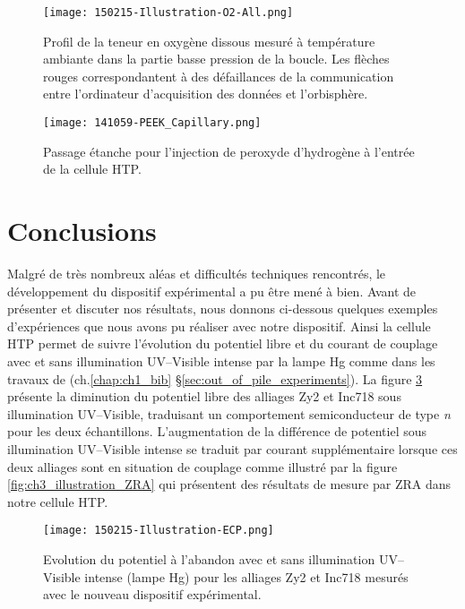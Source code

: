 \begin{refsection}
    \begin{figure}[H]
        \centering
        \texttt{[image: 150215-Illustration-O2-All.png]}
        \caption{Profil de la teneur en oxygène dissous mesuré à température ambiante dans la partie basse pression de
        la boucle. Les flèches rouges correspondantent à des défaillances de la communication entre l'ordinateur
    d'acquisition des données et l'orbisphère.}
        \label{fig:ch3_O2_management}
    \end{figure}

    \begin{figure}[H]
        \centering
        \texttt{[image: 141059-PEEK\_Capillary.png]}
        \caption{Passage étanche pour l'injection de peroxyde d'hydrogène à l'entrée de la cellule HTP.}
        \label{fig:ch3_PEEK_capillary}
    \end{figure}

\section{Conclusions}\label{sec:ch3_conclusion}

    Malgré de très nombreux aléas et difficultés techniques rencontrés, le développement du dispositif expérimental
    a pu être mené à bien. Avant de présenter et discuter nos résultats, nous donnons ci-dessous quelques exemples
    d'expériences que nous avons pu réaliser avec notre dispositif.
    Ainsi la cellule HTP permet de
    suivre l'évolution du potentiel libre et du courant de couplage avec et sans illumination UV--Visible intense par la lampe
    Hg comme dans les travaux de \citet{Kim2010} (ch.\ref{chap:ch1_bib} \S\ref{sec:out_of_pile_experiments}). La
    figure \ref{fig:ch3_illustration_ECP} présente la diminution du potentiel libre des alliages Zy2 et Inc718 sous
    illumination UV--Visible, traduisant un comportement semiconducteur de type \emph{n} pour les deux échantillons. L'augmentation de la différence de
    potentiel sous illumination UV--Visible intense se traduit par courant supplémentaire lorsque ces deux alliages sont en situation de
    couplage  comme illustré par la figure \ref{fig:ch3_illustration_ZRA} qui présentent des résultats de mesure par ZRA
    dans notre cellule HTP.

    \begin{figure}[H]
        \centering
            \texttt{[image: 150215-Illustration-ECP.png]}
            \caption{Evolution du potentiel à l'abandon avec et sans illumination UV--Visible intense (lampe Hg) pour les
            alliages Zy2 et Inc718 mesurés avec le nouveau dispositif expérimental.}
            \label{fig:ch3_illustration_ECP}
    \end{figure}


\end{refsection}
